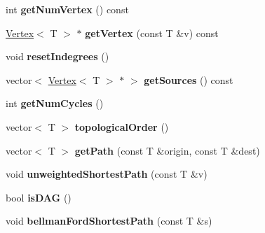 \begin{DoxyCompactItemize}
\item 
int {\bfseries get\+Num\+Vertex} () const \hypertarget{class_graph_a295932f117d92c825a97ec458e0fb332}{}\label{class_graph_a295932f117d92c825a97ec458e0fb332}

\item 
\hyperlink{class_vertex}{Vertex}$<$ T $>$ $\ast$ {\bfseries get\+Vertex} (const T \&v) const \hypertarget{class_graph_a08a95472b0d9bd7321660940807af060}{}\label{class_graph_a08a95472b0d9bd7321660940807af060}

\item 
void {\bfseries reset\+Indegrees} ()\hypertarget{class_graph_af34eb86d804272e6e3e221a9ed688c53}{}\label{class_graph_af34eb86d804272e6e3e221a9ed688c53}

\item 
vector$<$ \hyperlink{class_vertex}{Vertex}$<$ T $>$ $\ast$ $>$ {\bfseries get\+Sources} () const \hypertarget{class_graph_aa1a3c754f51a888e25dff2b26dfb85fc}{}\label{class_graph_aa1a3c754f51a888e25dff2b26dfb85fc}

\item 
int {\bfseries get\+Num\+Cycles} ()\hypertarget{class_graph_a694dff81073c38b669057f0c6bd4cbb1}{}\label{class_graph_a694dff81073c38b669057f0c6bd4cbb1}

\item 
vector$<$ T $>$ {\bfseries topological\+Order} ()\hypertarget{class_graph_a2e75512c089c3916dda9cf61e1185d9d}{}\label{class_graph_a2e75512c089c3916dda9cf61e1185d9d}

\item 
vector$<$ T $>$ {\bfseries get\+Path} (const T \&origin, const T \&dest)\hypertarget{class_graph_ab4054ca572c10669dd3e05d6d41c116c}{}\label{class_graph_ab4054ca572c10669dd3e05d6d41c116c}

\item 
void {\bfseries unweighted\+Shortest\+Path} (const T \&v)\hypertarget{class_graph_ae5264597aacaf4f45819e96a6d6c89aa}{}\label{class_graph_ae5264597aacaf4f45819e96a6d6c89aa}

\item 
bool {\bfseries is\+D\+AG} ()\hypertarget{class_graph_ab49d07c2bd6b8b30d5ae82bc558b821a}{}\label{class_graph_ab49d07c2bd6b8b30d5ae82bc558b821a}

\item 
void {\bfseries bellman\+Ford\+Shortest\+Path} (const T \&s)\hypertarget{class_graph_a1d6769b79beaa76f78fd9c9209833bef}{}\label{class_graph_a1d6769b79beaa76f78fd9c9209833bef}


\end{DoxyCompactItemize}

